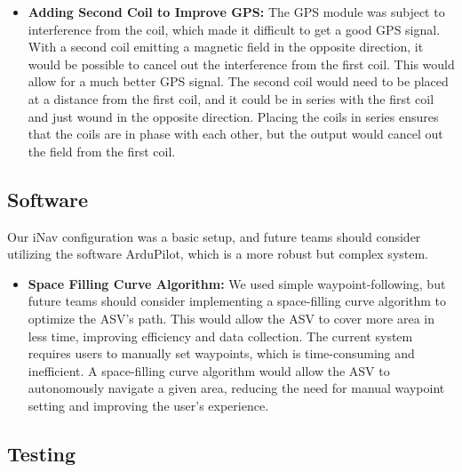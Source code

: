 \begin{itemize}
  \item \textbf{Adding Second Coil to Improve GPS:}
    The GPS module was subject to interference from the coil, which made it difficult to get a good GPS signal. With a second coil emitting a magnetic field in the opposite direction, it would be possible to cancel out the interference from the first coil. This would allow for a much better GPS signal. The second coil would need to be placed at a distance from the first coil, and it could be in series with the first coil and just wound in the opposite direction. Placing the coils in series ensures that the coils are in phase with each other, but the output would cancel out the field from the first coil.
\end{itemize}
    
\subsection{Software}
Our iNav configuration was a basic setup, and future teams should consider utilizing the software ArduPilot, which is a more robust but complex system.
\begin{itemize}
  \item \textbf{Space Filling Curve Algorithm:} 
    We used simple waypoint-following, but future teams should consider implementing a space-filling curve algorithm to optimize the ASV's path. This would allow the ASV to cover more area in less time, improving efficiency and data collection. The current system requires users to manually set waypoints, which is time-consuming and inefficient. A space-filling curve algorithm would allow the ASV to autonomously navigate a given area, reducing the need for manual waypoint setting and improving the user's experience.
\end{itemize}
\subsection{Testing}

